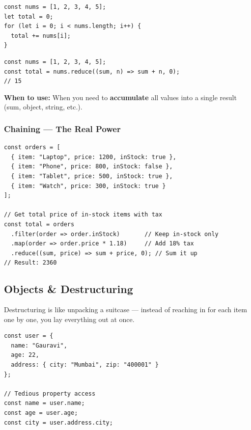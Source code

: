 \documentclass[12pt]{article}
\begin{document}
\begin{badway}
\begin{lstlisting}
const nums = [1, 2, 3, 4, 5];
let total = 0;
for (let i = 0; i < nums.length; i++) {
  total += nums[i];
}
\end{lstlisting}
\end{badway}

\begin{proway}
\begin{lstlisting}
const nums = [1, 2, 3, 4, 5];
const total = nums.reduce((sum, n) => sum + n, 0);
// 15
\end{lstlisting}
\end{proway}

\textbf{When to use:} When you need to \textbf{accumulate} all values into a single result (sum, object, string, etc.).

\subsubsection*{Chaining --- The Real Power}

\begin{lstlisting}
const orders = [
  { item: "Laptop", price: 1200, inStock: true },
  { item: "Phone", price: 800, inStock: false },
  { item: "Tablet", price: 500, inStock: true },
  { item: "Watch", price: 300, inStock: true }
];

// Get total price of in-stock items with tax
const total = orders
  .filter(order => order.inStock)       // Keep in-stock only
  .map(order => order.price * 1.18)     // Add 18% tax
  .reduce((sum, price) => sum + price, 0); // Sum it up
// Result: 2360
\end{lstlisting}

\subsection{Objects \& Destructuring}

Destructuring is like unpacking a suitcase --- instead of reaching in for each item one by one, you lay everything out at once.

\begin{badway}
\begin{lstlisting}
const user = {
  name: "Gauravi",
  age: 22,
  address: { city: "Mumbai", zip: "400001" }
};

// Tedious property access
const name = user.name;
const age = user.age;
const city = user.address.city;
\end{lstlisting}
\end{badway}
\end{document}
